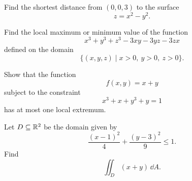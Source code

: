 \begin{problem}
Find the shortest distance from $(0, 0, 3)$ to the surface
\[
z=x^2-y^2.
\]
\end{problem}

\begin{problem}
Find the local maximum or minimum value of the function
\[
x^3+y^3+z^3-3xy-3yz-3zx
\]
defined on the domain
\[
\{(x, y, z)\mid x>0, \ y>0, \ z>0\}.
\]
\end{problem}

\begin{problem}
Show that the function
\[
f(x, y)=x+y
\]
subject to the constraint
\[
x^3+x+y^3+y=1
\]
has at most one local extremum.
\end{problem}

\begin{problem}
Let $D\subseteq\mathbb{R}^2$ be the domain given by
\[
\frac{(x-1)^2}{4}+\frac{(y-3)^2}{9}\le1.
\]
Find
\[
\iint_D(x+y)\,\dd A.
\]
\end{problem}

